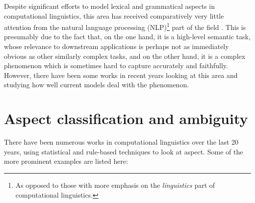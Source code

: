 
Despite significant efforts to model lexical and grammatical aspects in computational linguistics, this area has received comparatively very little attention from the natural language processing (NLP)\footnote{As opposed to those with more emphasis on the \emph{linguistics} part of computational linguistics.} part of the field \citep{friedrich-etal-2023-kind}. This is presumably due to the fact that, on the one hand, it is a high-level semantic task, whose relevance to downstream applications is perhaps not as immediately obvious as other similarly complex tasks, and on the other hand, it is a complex phenomenon which is sometimes hard to capture accurately and faithfully. However, there have been some works in recent years looking at this area and studying how well current models deal with the phenomenon.
\section{Aspect classification and ambiguity}
\label{sect:previous_asp_class}
There have been numerous works in computational linguistics over the last 20 years, using statistical and rule-based techniques to look at aspect. Some of the more prominent examples are listed here:

